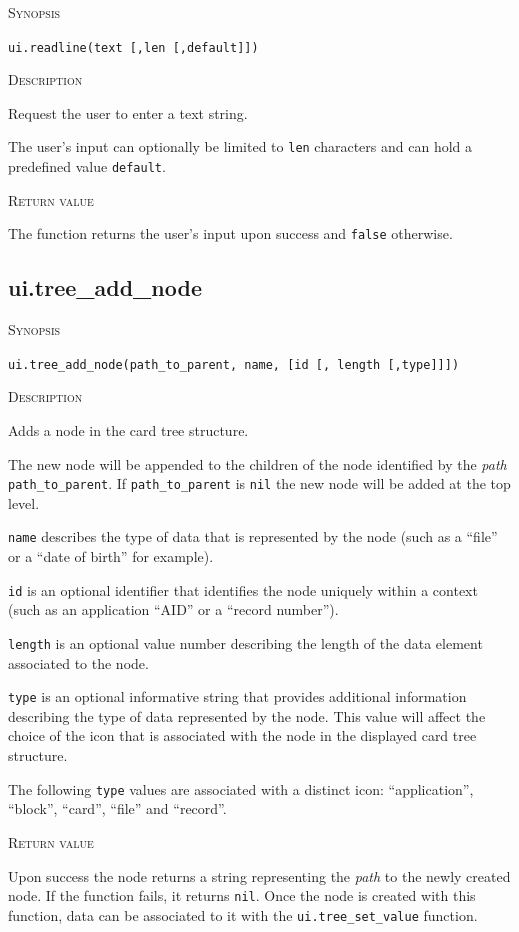 \documentclass[11pt]{report}
\newcommand{\mansection}[1]{\vspace{0.5em}\par\noindent\textsc{#1}\vspace{0.5em}\par}
\newcommand{\syn}[1]{\texttt{#1}}
\begin{document}
\mansection{Synopsis}
\syn{ui.readline(text [,\syn{len} [,\syn{default}]])}

\mansection{Description}
  Request the user to enter a text string. 

  The user's input can optionally be limited to \syn{len} characters and 
  can hold a predefined value \syn{default}.
  
\mansection{Return value}
  The function returns the user's input upon success and \syn{false} otherwise.


\subsection{ui.tree\_add\_node}

\mansection{Synopsis}
\syn{ui.tree\_add\_node(path\_to\_parent, name, [\syn{id} [, \syn{length} [,\syn{type}]]])}

\mansection{Description}
  Adds a node in the card tree structure. 

  The new node will be appended to the children of the node identified by the 
  \emph{path} \syn{path\_to\_parent}.
  If \syn{path\_to\_parent} is \syn{nil} the new node will be added at 
  the top level.

  \syn{name} describes the type of data that is represented by the node 
  (such as a ``file'' or a ``date of birth'' for example). 

  \syn{id} is an optional identifier that identifies the node uniquely within 
  a context (such as an application ``AID'' or a ``record number'').

  \syn{length} is an optional value number describing the length of the 
  data element associated to the node.

  \syn{type} is an optional informative string that provides additional 
  information describing the type of data represented by the node. This value
  will affect the choice of the icon that is associated with the node in the 
  displayed card tree structure. 

  The following \syn{type} values are associated with a distinct icon: ``application'', ``block'', ``card'', ``file'' and ``record''.
  
\mansection{Return value}
  Upon success the node returns a string representing the \emph{path} to the 
  newly created node. 
  If the function fails, it returns \syn{nil}.
  Once the node is created with this function, data can be associated to it with the \syn{ui.tree\_set\_value} function.
\end{document}
